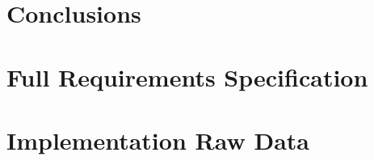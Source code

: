 \documentclass[11pt, a4paper, openright]{report}
\begin{document}
\chapter{Conclusions}
\label{c:conclusions}
%



\begin{appendices}
\chapter{Full Requirements Specification}


\chapter{Implementation Raw Data}

	
\end{appendices}
\end{document}
